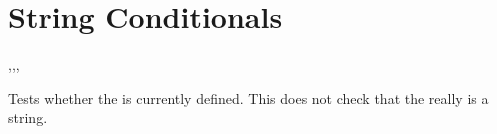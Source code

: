 \documentclass[oneside]{book}
\begin{document}
%

\section{String Conditionals}

\begin{function}{\strIfExist,\strIfExistT,\strIfExistF,\strIfExistTF}
\begin{syntax}
 
  
  
   
\end{syntax}
Tests whether the  is currently defined.  This does not
check that the  really is a string.
\begin{demohigh}
\strIfExistTF {} {}
\strIfExistTF {} {}
\end{demohigh}
\end{function}
\end{document}
